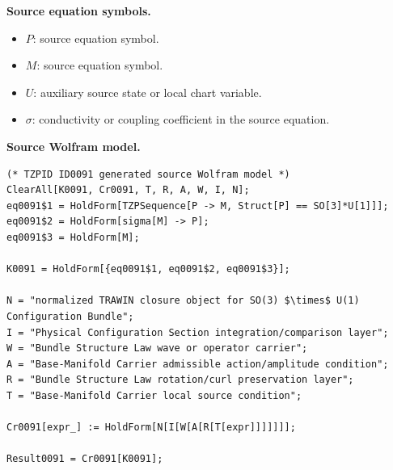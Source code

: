 \begin{minipage}[t]{0.49\linewidth}
\begingroup
\small
\raggedright
\textbf{Source equation symbols.}\par
\begin{itemize}[leftmargin=1.35em,itemsep=1pt,topsep=1pt,parsep=0pt]
    \item $P$: source equation symbol.
    \item $M$: source equation symbol.
    \item $U$: auxiliary source state or local chart variable.
    \item $\sigma$: conductivity or coupling coefficient in the source equation.
\end{itemize}
\endgroup
\end{minipage}\hfill
\begin{minipage}[t]{0.47\linewidth}
\begingroup
\scriptsize
\raggedright
\textbf{Source Wolfram model.}\par
\begin{Verbatim}[fontsize=\tiny,breaklines=true,breakanywhere=true]
(* TZPID ID0091 generated source Wolfram model *)
ClearAll[K0091, Cr0091, T, R, A, W, I, N];
eq0091$1 = HoldForm[TZPSequence[P -> M, Struct[P] == SO[3]*U[1]]];
eq0091$2 = HoldForm[sigma[M] -> P];
eq0091$3 = HoldForm[M];

K0091 = HoldForm[{eq0091$1, eq0091$2, eq0091$3}];

N = "normalized TRAWIN closure object for SO(3) $\times$ U(1) Configuration Bundle";
I = "Physical Configuration Section integration/comparison layer";
W = "Bundle Structure Law wave or operator carrier";
A = "Base-Manifold Carrier admissible action/amplitude condition";
R = "Bundle Structure Law rotation/curl preservation layer";
T = "Base-Manifold Carrier local source condition";

Cr0091[expr_] := HoldForm[N[I[W[A[R[T[expr]]]]]]];

Result0091 = Cr0091[K0091];
\end{Verbatim}
\endgroup
\end{minipage}

